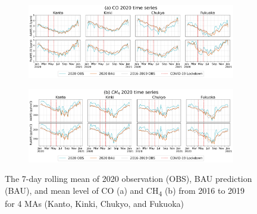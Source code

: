 \begin{figure}[tbh!]
    \centering
    \begin{subfigure}{\textwidth}
      \centering
      \includegraphics[width=\textwidth]{figs/chap4/fig8a.png}
    \end{subfigure}

    \begin{subfigure}{\textwidth}
      \centering
      \includegraphics[width=\textwidth]{figs/chap4/fig8b.png}
    \end{subfigure}
    \caption[2020 CO and CH\textsubscript{4} mean trends (4 MAs)]{The 7-day rolling mean of 2020 observation (OBS), BAU prediction (BAU), and mean level of CO (a) and CH\textsubscript{4} (b) from 2016 to 2019 for 4 MAs (Kanto, Kinki, Chukyo, and Fukuoka)}
    \label{fig:chap4_fig8}
\end{figure}

